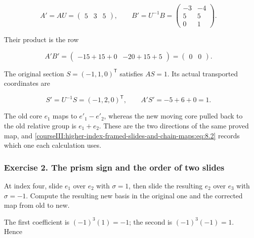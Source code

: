 \begin{equation}
A'=AU=\begin{pmatrix}5&3&5\end{pmatrix},
 \qquad
 B'=U^{-1}B=
 \begin{pmatrix}-3&-4\\5&5\\0&1\end{pmatrix}.
 \label{courseIII:higher-index-framed-slides-and-chain-maps:eq:8.3}
\end{equation}

Their product is the row

\begin{equation}
A'B'=\begin{pmatrix}-15+15+0&-20+15+5\end{pmatrix}
      =\begin{pmatrix}0&0\end{pmatrix}.
 \label{courseIII:higher-index-framed-slides-and-chain-maps:eq:8.4}
\end{equation}

The original section \(S=(-1,1,0)^{\mathsf T}\) satisfies \(AS=1\). Its actual transported coordinates are

\begin{equation}
S'=U^{-1}S=(-1,2,0)^{\mathsf T},\qquad
 A'S'=-5+6+0=1.
 \label{courseIII:higher-index-framed-slides-and-chain-maps:eq:8.5}
\end{equation}

The old core \(e_1\) maps to \(e'_1-e'_2\), whereas the new moving core pulled back to the old relative group is \(e_1+e_2\). These are the two directions of the same proved map, and \eqref{courseIII:higher-index-framed-slides-and-chain-maps:eq:8.2} records which one each calculation uses.

\subsubsection{Exercise 2. The prism sign and the order of two slides}
\label{courseIII:higher-index-framed-slides-and-chain-maps:exercise-2}

\label{courseIII:higher-slides:8.2}

At index four, slide \(e_1\) over \(e_2\) with \(\sigma=1\), then slide the resulting \(e_2\) over \(e_3\) with \(\sigma=-1\). Compute the resulting new basis in the original one and the corrected map from old to new.

The first coefficient is \((-1)^3(1)=-1\); the second is \((-1)^3(-1)=1\). Hence

